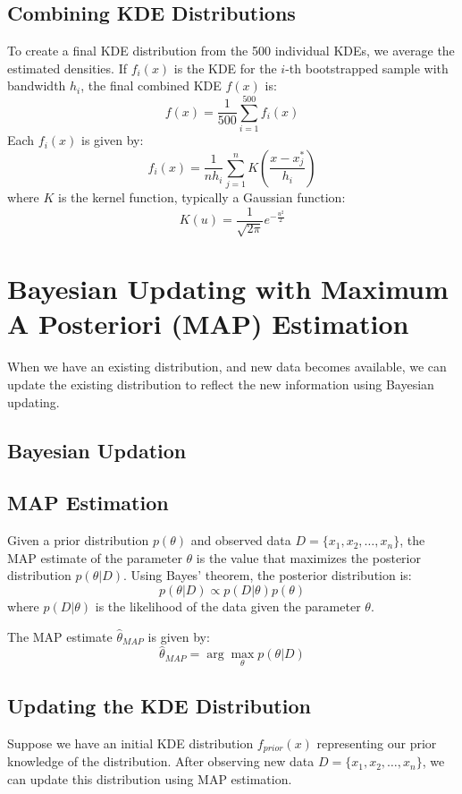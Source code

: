 \documentclass[conference]{IEEEtran}
\begin{document}
\subsection{Combining KDE Distributions}
To create a final KDE distribution from the 500 individual KDEs, we average the estimated densities. If \( f_i(x) \) is the KDE for the \( i \)-th bootstrapped sample with bandwidth \( h_i \), the final combined KDE \( f(x) \) is:
\[
f(x) = \frac{1}{500} \sum_{i=1}^{500} f_i(x)
\]
Each \( f_i(x) \) is given by:
\[
f_i(x) = \frac{1}{n h_i} \sum_{j=1}^{n} K \left( \frac{x - x_j^*}{h_i} \right)
\]
where \( K \) is the kernel function, typically a Gaussian function:
\[
K(u) = \frac{1}{\sqrt{2\pi}} e^{-\frac{u^2}{2}}
\]

\section{Bayesian Updating with Maximum A Posteriori (MAP) Estimation}
When we have an existing distribution, and new data becomes available, we can update the existing distribution to reflect the new information using Bayesian updating. 
\subsection{Bayesian Updation}
\subsection{MAP Estimation}
Given a prior distribution \( p(\theta) \) and observed data \( D = \{x_1, x_2, \ldots, x_n\} \), the MAP estimate of the parameter \( \theta \) is the value that maximizes the posterior distribution \( p(\theta | D) \). Using Bayes' theorem, the posterior distribution is:
\[
p(\theta | D) \propto p(D | \theta) p(\theta)
\]
where \( p(D | \theta) \) is the likelihood of the data given the parameter \( \theta \).

The MAP estimate \( \hat{\theta}_{MAP} \) is given by:
\[
\hat{\theta}_{MAP} = \arg \max_\theta p(\theta | D)
\]

\subsection{Updating the KDE Distribution}
Suppose we have an initial KDE distribution \( f_{prior}(x) \) representing our prior knowledge of the distribution. After observing new data \( D = \{x_1, x_2, \ldots, x_n\} \), we can update this distribution using MAP estimation.
\end{document}
